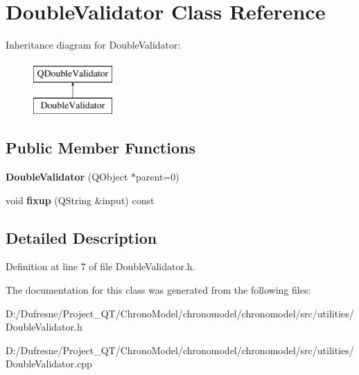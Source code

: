 \hypertarget{class_double_validator}{\section{Double\-Validator Class Reference}
\label{class_double_validator}
}
Inheritance diagram for Double\-Validator\-:\begin{figure}[H]
\begin{center}
\leavevmode
\includegraphics[height=2.000000cm]{class_double_validator}
\end{center}
\end{figure}
\subsection*{Public Member Functions}
\begin{DoxyCompactItemize}
\item 
\hypertarget{class_double_validator_a03f27897bb30f46211f0d36c6069ef56}{{\bfseries Double\-Validator} (Q\-Object $\ast$parent=0)}\label{class_double_validator_a03f27897bb30f46211f0d36c6069ef56}

\item 
\hypertarget{class_double_validator_a89f0fa4f6bdb9b71b367892f6a547680}{void {\bfseries fixup} (Q\-String \&input) const }\label{class_double_validator_a89f0fa4f6bdb9b71b367892f6a547680}

\end{DoxyCompactItemize}


\subsection{Detailed Description}


Definition at line 7 of file Double\-Validator.\-h.



The documentation for this class was generated from the following files\-:\begin{DoxyCompactItemize}
\item 
D\-:/\-Dufresne/\-Project\-\_\-\-Q\-T/\-Chrono\-Model/chronomodel/chronomodel/src/utilities/Double\-Validator.\-h\item 
D\-:/\-Dufresne/\-Project\-\_\-\-Q\-T/\-Chrono\-Model/chronomodel/chronomodel/src/utilities/Double\-Validator.\-cpp\end{DoxyCompactItemize}
